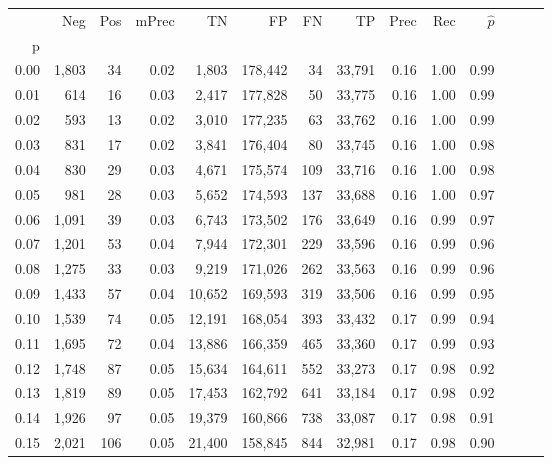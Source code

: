\begin{tabular}{rrrrrrrrrrrrrr}
\toprule
{} &    Neg &  Pos & mPrec &       TN &       FP &      FN &      TP &  Prec &   Rec & $\hat{p}$ \\
p    &        &      &       &          &          &         &         &       &       &           \\
\midrule
0.00 &  1,803 &   34 &  0.02 &    1,803 &  178,442 &      34 &  33,791 &  0.16 &  1.00 &      0.99 \\
0.01 &    614 &   16 &  0.03 &    2,417 &  177,828 &      50 &  33,775 &  0.16 &  1.00 &      0.99 \\
0.02 &    593 &   13 &  0.02 &    3,010 &  177,235 &      63 &  33,762 &  0.16 &  1.00 &      0.99 \\
0.03 &    831 &   17 &  0.02 &    3,841 &  176,404 &      80 &  33,745 &  0.16 &  1.00 &      0.98 \\
0.04 &    830 &   29 &  0.03 &    4,671 &  175,574 &     109 &  33,716 &  0.16 &  1.00 &      0.98 \\
0.05 &    981 &   28 &  0.03 &    5,652 &  174,593 &     137 &  33,688 &  0.16 &  1.00 &      0.97 \\
0.06 &  1,091 &   39 &  0.03 &    6,743 &  173,502 &     176 &  33,649 &  0.16 &  0.99 &      0.97 \\
0.07 &  1,201 &   53 &  0.04 &    7,944 &  172,301 &     229 &  33,596 &  0.16 &  0.99 &      0.96 \\
0.08 &  1,275 &   33 &  0.03 &    9,219 &  171,026 &     262 &  33,563 &  0.16 &  0.99 &      0.96 \\
0.09 &  1,433 &   57 &  0.04 &   10,652 &  169,593 &     319 &  33,506 &  0.16 &  0.99 &      0.95 \\
0.10 &  1,539 &   74 &  0.05 &   12,191 &  168,054 &     393 &  33,432 &  0.17 &  0.99 &      0.94 \\
0.11 &  1,695 &   72 &  0.04 &   13,886 &  166,359 &     465 &  33,360 &  0.17 &  0.99 &      0.93 \\
0.12 &  1,748 &   87 &  0.05 &   15,634 &  164,611 &     552 &  33,273 &  0.17 &  0.98 &      0.92 \\
0.13 &  1,819 &   89 &  0.05 &   17,453 &  162,792 &     641 &  33,184 &  0.17 &  0.98 &      0.92 \\
0.14 &  1,926 &   97 &  0.05 &   19,379 &  160,866 &     738 &  33,087 &  0.17 &  0.98 &      0.91 \\
0.15 &  2,021 &  106 &  0.05 &   21,400 &  158,845 &     844 &  32,981 &  0.17 &  0.98 &      0.90 \\

\end{tabular}
